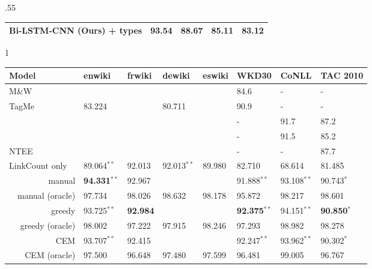 \documentclass[letterpaper]{article}
\newcommand*\rot{\rotatebox{90}}
\newcommand{\oneS}{\ensuremath{{}^{\textstyle *}}}
\newcommand{\twoS}{\ensuremath{{}^{\textstyle **}}}
\begin{document}
\begin{table*}[ht]
\begin{center}
\begin{subtable}{.55\linewidth}
\begin{center}
\begin{tabular}{ |l|r|r|r|r|}
Bi-LSTM-CNN (Ours) + types          & 93.54 & 88.67 & {\bf 85.11} & 83.12\\
\hline
\end{tabular}
\end{center}
\label{table:ner}
    \end{subtable}
    \begin{subtable}{1\linewidth}
    \caption{Entity Linking model Comparison. Significant improvements over prior work denoted by \oneS\, for $p<0.05$, and \twoS\, for $p<0.01$.}
\begin{center}
\begin{tabular}{ |c|r|l|l|l|l|l|l|l|}
\hline
     \multicolumn{2}{|l|}{Model} & enwiki & frwiki & dewiki & eswiki & \textsc{WKD30} & CoNLL & TAC 2010\\
\hline
\multicolumn{2}{|l|}{M\&W\cite{milne2008learning}} &        & & & & 84.6  & - & -\\
\multicolumn{2}{|l|}{TagMe \cite{tagme}}                       & 83.224 & & 80.711 & & 90.9 & - & -\\
\multicolumn{2}{|l|}{\cite{globerson2016collective}}      &
   & & & &        - & 91.7 & 87.2\\
\multicolumn{2}{|l|}{\cite{yamada2016joint}}      &        & & & &   - & 91.5 & 85.2\\
\multicolumn{2}{|l|}{NTEE \cite{yamada2017learning}}      &        & & & &        - & - & 87.7\\
\hline
\multicolumn{2}{|l|}{$\mathrm{LinkCount}$ only }    & 89.064\twoS
&  92.013 &  92.013\twoS &  89.980 & 82.710 &  68.614 & 81.485\\
\hline
\multirow{10}{*}{\rot{Ours}} & manual                & {\bf94.331\twoS} & 92.967 & &        & 91.888\twoS & 93.108\twoS & 90.743\oneS \\
& manual (oracle)                                    & 97.734  & 98.026 & 98.632 & 98.178 & 95.872 & 98.217 & 98.601\\
& greedy                                             & 93.725\twoS  & {\bf 92.984} & & & {\bf 92.375\twoS} & 94.151\twoS & {\bf90.850\oneS}\\
& greedy (oracle)                                    & 98.002  & 97.222 & 97.915 & 98.246 & 97.293 & 98.982 & 98.278\\
& CEM                                                & 93.707\twoS  & 92.415 & & & 92.247\twoS & 93.962\twoS & 90.302\oneS\\
& CEM (oracle)                                       & 97.500  & 96.648 & 97.480 & 97.599 & 96.481 & 99.005 & 96.767\\

\end{tabular}
\end{center}
\end{subtable}
\end{center}
\end{table*}
\end{document}
